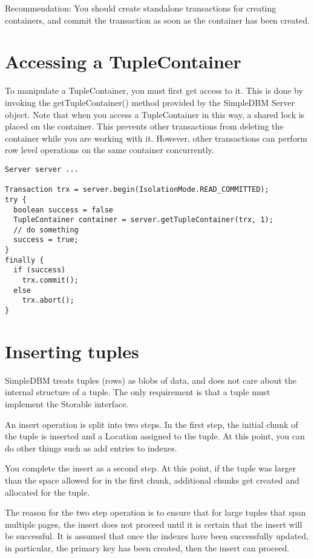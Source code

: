 \documentclass[a4paper,draft,oneside]{book}
\begin{document}
Recommendation: You should create standalone transactions for creating
containers, and commit the transaction as soon as the container has been
created.

\section{Accessing a TupleContainer}

To manipulate a TupleContainer, you must first get access to it. This
is done by invoking the getTupleContainer() method provided by the
SimpleDBM Server object. Note that when you access a TupleContainer in
this way, a shared lock is placed on the container. This prevents
other transactions from deleting the container while you are working
with it. However, other transactions can perform row level operations
on the same container concurrently.

\begin{verbatim}
Server server ...

Transaction trx = server.begin(IsolationMode.READ_COMMITTED);
try {
  boolean success = false      
  TupleContainer container = server.getTupleContainer(trx, 1);
  // do something
  success = true;
}
finally {
  if (success)
    trx.commit();
  else
    trx.abort();
}
\end{verbatim}

\section{Inserting tuples}

SimpleDBM treats tuples (rows) as blobs of data, and does not care
about the internal structure of a tuple. The only requirement is that
a tuple must implement the Storable interface.

An insert operation is split into two steps. In the first step,
the initial chunk of the tuple is inserted and a Location assigned to
the tuple. At this point, you can do other things such as add entries 
to indexes. 

You complete the insert as a second step. At this point, if the tuple
was larger than the space allowed for in the first chunk, additional
chunks get created and allocated for the tuple.

The reason for the two step operation is to ensure that for large
tuples that span multiple pages, the insert does not proceed until it
is certain that the insert will be successful. It is assumed that once
the indexes have been successfully updated, in particular, the primary
key has been created, then the insert can proceed.
\end{document}
